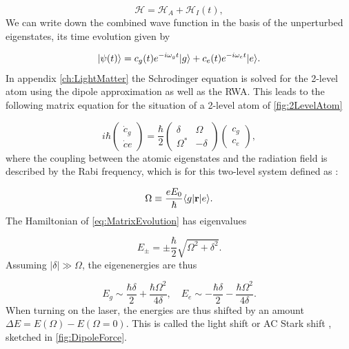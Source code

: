 \begin{equation}\label{eq:PerturbationMain}
	\mathcal{H} = \mathcal{H}_A + \mathcal{H}_{I}(t),
\end{equation}
We can write down the combined wave function in the basis of the unperturbed eigenstates, its time evolution given by

\begin{equation}\label{eq:TwoLevelMain}
	\lvert\psi(t)\rangle = c_g(t) e^{-i \omega_g t} \lvert g\rangle + c_e(t) e^{-i \omega_e t} \lvert e\rangle.
\end{equation}
In appendix \ref{ch:LightMatter} the Schrodinger equation is solved for the 2-level atom using the dipole approximation as well as the \ac{RWA}. 
This leads to the following matrix equation for the situation of a 2-level atom of \cref{fig:2LevelAtom} \cite{Foot2005}

\begin{equation}\label{eq:MatrixEvolution}
	i \hbar \begin{pmatrix}
		\dot{c}_g \\ 
		\dot{c}e
	\end{pmatrix}
	= \frac{\hbar}{2} \begin{pmatrix}
		\delta & \Omega \\ \Omega^* & -\delta 
	\end{pmatrix} 
	\begin{pmatrix}
		c_g \\ c_e
	\end{pmatrix},
\end{equation}
where the coupling between the atomic eigenstates and the radiation field is described by the Rabi frequency, which is for this two-level system defined as \cite{Metcalf1999}:

\begin{equation}\label{eq:RabiFrequencyMain}
	\Omega \equiv \frac{e E_0}{\hbar} \langle g\rvert\mathbf{r}\lvert e\rangle.
\end{equation}
The Hamiltonian of \cref{eq:MatrixEvolution} has eigenvalues 

\begin{equation}\label{eq:EigenValues}
	E_{\pm} = \pm
	\frac{\hbar}{2} \sqrt{\Omega^2+\delta^2}.
\end{equation}
Assuming $|\delta| \gg \Omega$, the eigenenergies are thus 

\begin{equation}\label{eq:SemiClassicalEigenvalues}
	E_g \sim  \frac{\hbar \delta}{2} +\frac{\hbar \Omega^2}{4 \delta}, \quad
	E_e \sim -\frac{\hbar \delta}{2} -\frac{\hbar \Omega^2}{4 \delta}.
\end{equation}
When turning on the laser, the energies are thus shifted by an amount $\Delta E = E(\Omega)-E(\Omega=0)$. 
This is called the light shift or AC Stark shift \cite{Metcalf1999}, sketched in \cref{fig:DipoleForce}.

